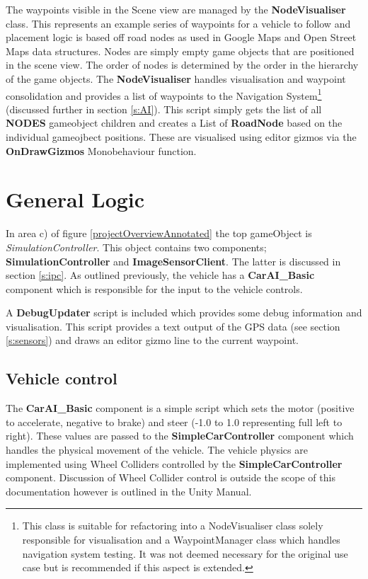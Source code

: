 \documentclass{article}
\begin{document}
The waypoints visible in the Scene view are managed by the \textbf{NodeVisualiser} class. This represents an example series of waypoints for a vehicle to follow and placement logic is based off road nodes as used in Google Maps and Open Street Maps data structures. Nodes are simply empty game objects that are positioned in the scene view. The order of nodes is determined by the order in the hierarchy of the game objects. The \textbf{NodeVisualiser} handles visualisation and waypoint consolidation and provides a list of waypoints to the Navigation System\footnote{This class is suitable for refactoring into a NodeVisualiser class solely responsible for visualisation and a WaypointManager class which handles navigation system testing. It was not deemed necessary for the original use case but is recommended if this aspect is extended.} (discussed further in section \ref{s:AI}). This script simply gets the list of all \textbf{NODES} gameobject children and creates a List of \textbf{RoadNode} based on the individual gameojbect positions. These are visualised using editor gizmos via the \textbf{OnDrawGizmos} Monobehaviour function.

\section{General Logic}

In area c) of figure \ref{projectOverviewAnnotated} the top gameObject is \textit{SimulationController}. This object contains two components; \textbf{SimulationController} and \textbf{ImageSensorClient}. The latter is discussed in section \ref{s:ipc}. As outlined previously, the vehicle has a \textbf{CarAI\_Basic} component which is responsible for the input to the vehicle controls.

A \textbf{DebugUpdater} script is included which provides some debug information and visualisation. This script provides a text output of the GPS data (see section \ref{s:sensors}) and draws an editor gizmo line to the current waypoint.

\subsection{Vehicle control}

The \textbf{CarAI\_Basic} component is a simple script which sets the motor (positive to accelerate, negative to brake) and steer (-1.0 to 1.0 representing full left to right). These values are passed to the \textbf{SimpleCarController} component which handles the physical movement of the vehicle. The vehicle physics are implemented using Wheel Colliders controlled by the \textbf{SimpleCarController} component. Discussion of Wheel Collider control is outside the scope of this documentation however is outlined in the Unity Manual.
\end{document}

